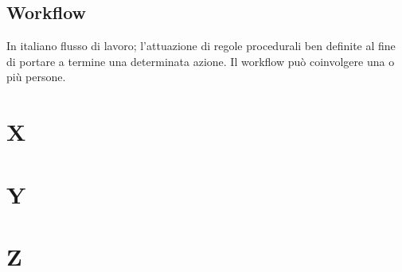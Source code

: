 \subsection*{Workflow}
In italiano flusso di lavoro; l'attuazione di regole procedurali ben definite al fine di portare a termine una determinata azione. Il workflow può coinvolgere una o più persone.


\clearpage
\section*{X}

\clearpage
\section*{Y}

\clearpage
\section*{Z}
